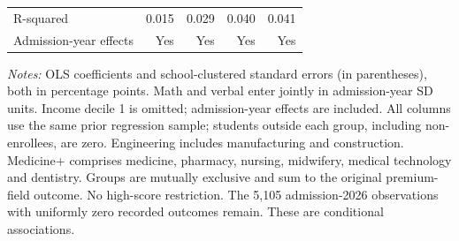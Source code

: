 \begin{table}[!htbp]
\begin{tabular}{lrrrr}
R-squared & 0.015 & 0.029 & 0.040 & 0.041 \\
Admission-year effects & Yes & Yes & Yes & Yes \\
\hline\hline\end{tabular}
\begin{minipage}{0.98\textwidth}\footnotesize
\textit{Notes:} OLS coefficients and school-clustered standard errors (in parentheses), both in percentage points. Math and verbal enter jointly in admission-year SD units. Income decile 1 is omitted; admission-year effects are included. All columns use the same prior regression sample; students outside each group, including non-enrollees, are zero. Engineering includes manufacturing and construction. Medicine+ comprises medicine, pharmacy, nursing, midwifery, medical technology and dentistry. Groups are mutually exclusive and sum to the original premium-field outcome. No high-score restriction. The 5,105 admission-2026 observations with uniformly zero recorded outcomes remain. These are conditional associations.
\end{minipage}
\end{table}
